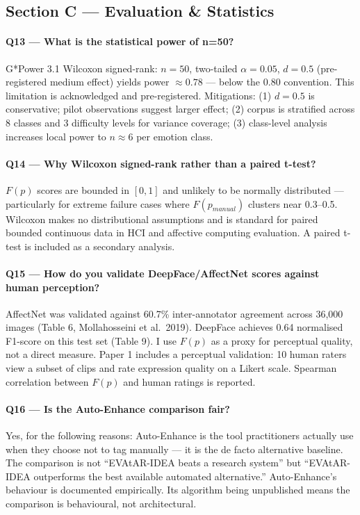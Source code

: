 \documentclass[12pt,a4paper]{article}
\begin{document}
\subsection*{Section C --- Evaluation \& Statistics}

\paragraph{Q13 --- What is the statistical power of n=50?}
G*Power 3.1 Wilcoxon signed-rank: $n=50$, two-tailed $\alpha=0.05$, $d=0.5$ (pre-registered medium effect) yields power $\approx 0.78$ --- below the 0.80 convention. This limitation is acknowledged and pre-registered. Mitigations: (1) $d=0.5$ is conservative; pilot observations suggest larger effect; (2) corpus is stratified across 8 classes and 3 difficulty levels for variance coverage; (3) class-level analysis increases local power to $n \approx 6$ per emotion class.

\paragraph{Q14 --- Why Wilcoxon signed-rank rather than a paired t-test?}
$F(p)$ scores are bounded in $[0,1]$ and unlikely to be normally distributed --- particularly for extreme failure cases where $F(p_{manual})$ clusters near 0.3--0.5. Wilcoxon makes no distributional assumptions and is standard for paired bounded continuous data in HCI and affective computing evaluation. A paired t-test is included as a secondary analysis.

\paragraph{Q15 --- How do you validate DeepFace/AffectNet scores against human perception?}
AffectNet was validated against 60.7\% inter-annotator agreement across 36,000 images (Table 6, Mollahosseini et al.\ 2019). DeepFace achieves 0.64 normalised F1-score on this test set (Table 9). I use $F(p)$ as a proxy for perceptual quality, not a direct measure. Paper 1 includes a perceptual validation: 10 human raters view a subset of clips and rate expression quality on a Likert scale. Spearman correlation between $F(p)$ and human ratings is reported.

\paragraph{Q16 --- Is the Auto-Enhance comparison fair?}
Yes, for the following reasons: Auto-Enhance is the tool practitioners actually use when they choose not to tag manually --- it is the de facto alternative baseline. The comparison is not ``EVAtAR-IDEA beats a research system'' but ``EVAtAR-IDEA outperforms the best available automated alternative.'' Auto-Enhance's behaviour is documented empirically. Its algorithm being unpublished means the comparison is behavioural, not architectural.
\end{document}
